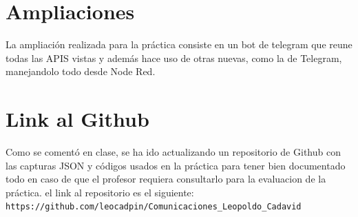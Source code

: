 \documentclass[12pt]{article}
\begin{document}
\section{Ampliaciones}

La ampliación realizada para la práctica consiste en un bot de telegram que reune todas las APIS vistas y además hace uso de otras nuevas, como la de Telegram, 
manejandolo todo desde Node Red. 

\section{Link al Github}
Como se comentó en clase, se ha ido actualizando un repositorio de Github con las capturas JSON y códigos usados en la práctica para tener bien documentado todo en caso de que el profesor
requiera consultarlo para la evaluacion de la práctica. el link al repositorio es el siguiente:\\

\verb|https://github.com/leocadpin/Comunicaciones_Leopoldo_Cadavid|
\end{document}
